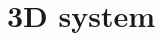 \documentclass[longbibliography, aps, prx, amsmath, amssymb, amsfonts, twocolumn,superscriptaddress, footinbib]{revtex4-1}
\begin{document}


	\section{3D system~\label{sec:appendC_3D}}
\end{document}
